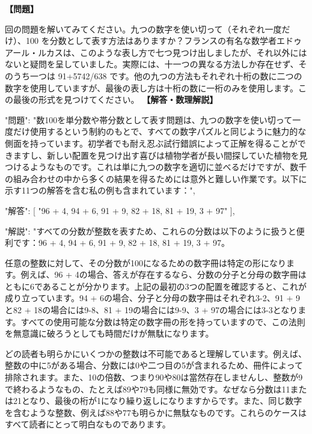 \documentclass[10pt,a4paper,oneside,openany]{ltjsbook}
\begin{document}
\begin{tcolorbox}[colback=softblue,colframe=primaryblue,title=\textbf{第 90 問：THE CENTURY PUZZLE.},arc=2mm,boxrule=1pt,breakable]
\textbf{【問題】}\par\vspace{0.3em}
回の問題を解いてみてください。九つの数字を使い切って（それぞれ一度だけ）、100 を分数として表す方法はありますか？フランスの有名な数学者エドゥアール・ルカスは、このような表し方で七つ見つけ出しましたが、それ以外にはないと疑問を呈していました。実際には、十一つの異なる方法しか存在せず、そのうち一つは 91+5742/638 です。他の九つの方法もそれぞれ十桁の数に二つの数字を使用していますが、最後の表し方は十桁の数に一桁のみを使用します。この最後の形式を見つけてください。
\tcblower
\textbf{【解答・数理解説】}\par\vspace{0.3em}
{
    "問題": "数100を単分数や帯分数として表す問題は、九つの数字を使い切って一度だけ使用するという制約のもとで、すべての数字パズルと同じように魅力的な側面を持っています。初学者でも耐え忍ぶ試行錯誤によって正解を得ることができますし、新しい配置を見つけ出す喜びは植物学者が長い間探していた植物を見つけるようなものです。これは単に九つの数字を適切に並べるだけですが、数千の組み合わせの中から多くの結果を得るためには意外と難しい作業です。以下に示す11つの解答を含む私の例も含まれています：",

    "解答": [
        "96 + 4, 94 + 6, 91 + 9, 82 + 18, 81 + 19, 3 + 97"
    ],

    "解説": "すべての分数が整数を表すため、これらの分数は以下のように扱うと便利です：96 + 4, 94 + 6, 91 + 9, 82 + 18, 81 + 19, 3 + 97。

任意の整数に対して、その分数が100になるための数字冊は特定の形になります。例えば、96 + 4の場合、答えが存在するなら、分数の分子と分母の数字冊はともに6であることが分かります。上記の最初の3つの配置を確認すると、これが成り立っています。94 + 6の場合、分子と分母の数字冊はそれぞれ3-2、91 + 9と82 + 18の場合には9-8、81 + 19の場合には9-9、3 + 97の場合には3-3となります。すべての使用可能な分数は特定の数字冊の形を持っていますので、この法則を無意識に破ろうとしても時間だけが無駄になります。

どの読者も明らかにいくつかの整数は不可能であると理解しています。例えば、整数の中に5がある場合、分数には0や二つ目の5が含まれるため、冊件によって排除されます。また、10の倍数、つまり90や80は當然存在しませんし、整数が9で終わるようなもの、たとえば89や79も同様に無効です。なぜなら分数は11または21となり、最後の桁が1になり繰り返しになりますからです。また、同じ数字を含むような整数、例えば88や77も明らかに無駄なものです。これらのケースはすべて読者にとって明白なものであります。

}
\end{tcolorbox}
\end{document}
